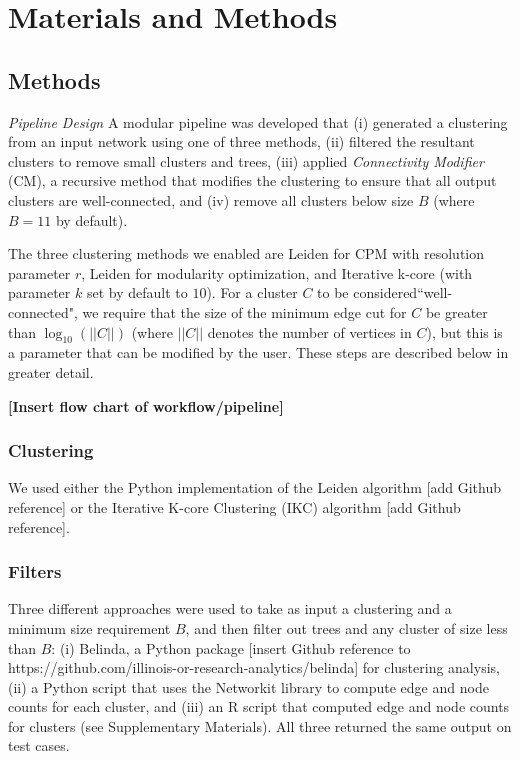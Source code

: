 \documentclass[12pt, oneside]{article}   	%
\begin{document}
\section{Materials and Methods}

\subsection{Methods} 
\emph{Pipeline Design} A modular pipeline was developed that (i) generated a clustering from an input network using one of three methods,  (ii) filtered the resultant clusters to remove small clusters and trees,  (iii) applied \emph{Connectivity Modifier} (CM), a recursive  method that modifies the clustering to ensure that all output clusters are well-connected, and (iv) remove all clusters below size $B$ (where $B=11$ by default).

The three clustering methods we enabled are Leiden for CPM with resolution parameter $r$, Leiden for modularity optimization, and Iterative k-core (with parameter $k$ set by default to $10$).
For  a cluster $C$ to be considered``well-connected", we require that the size of the minimum edge cut for $C$ be greater than $\log_{10}(||C||)$ (where $||C||$ denotes the number of vertices in $C$), but this
is a parameter that can be modified by the user.  
These steps are described below in greater detail. 

\vspace{5 mm}
\textbf{[Insert flow chart of workflow/pipeline]}

\subsubsection{Clustering} We used either the Python implementation of the Leiden algorithm [add Github reference] or the Iterative K-core Clustering (IKC) algorithm [add Github reference].

\subsubsection{Filters} Three different approaches were used to take as input a clustering and a minimum size requirement $B$, and then filter out trees and any cluster of size less than $B$:  (i) Belinda, a Python package [insert Github reference to https://github.com/illinois-or-research-analytics/belinda] for clustering analysis, (ii) a Python script that uses the Networkit library \citep{Staudt2016} to compute edge and node counts for each cluster, and (iii) an R script that computed edge and node counts for clusters (see Supplementary Materials). 
All three returned the same output on test cases. 
\end{document}
